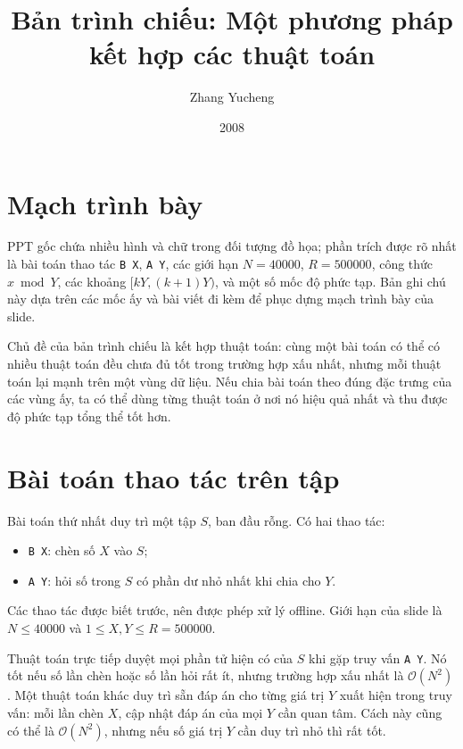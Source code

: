 \documentclass[11pt]{article}
\title{Bản trình chiếu: Một phương pháp kết hợp các thuật toán}
\author{Zhang Yucheng}
\date{2008}
\newcommand{\Oh}{\mathcal{O}}
\begin{document}
\maketitle


\section{Mạch trình bày}

PPT gốc chứa nhiều hình và chữ trong đối tượng đồ họa; phần trích được rõ
nhất là bài toán thao tác \texttt{B X}, \texttt{A Y}, các giới hạn
\(N=40000\), \(R=500000\), công thức \(x\bmod Y\), các khoảng
\([kY,(k+1)Y)\), và một số mốc độ phức tạp. Bản ghi chú này dựa trên các mốc
ấy và bài viết đi kèm để phục dựng mạch trình bày của slide.

Chủ đề của bản trình chiếu là kết hợp thuật toán: cùng một bài toán có thể có
nhiều thuật toán đều chưa đủ tốt trong trường hợp xấu nhất, nhưng mỗi thuật
toán lại mạnh trên một vùng dữ liệu. Nếu chia bài toán theo đúng đặc trưng
của các vùng ấy, ta có thể dùng từng thuật toán ở nơi nó hiệu quả nhất và thu
được độ phức tạp tổng thể tốt hơn.

\section{Bài toán thao tác trên tập}

Bài toán thứ nhất duy trì một tập \(S\), ban đầu rỗng. Có hai thao tác:
\begin{itemize}
  \item \texttt{B X}: chèn số \(X\) vào \(S\);
  \item \texttt{A Y}: hỏi số trong \(S\) có phần dư nhỏ nhất khi chia cho
  \(Y\).
\end{itemize}
Các thao tác được biết trước, nên được phép xử lý offline. Giới hạn của slide
là \(N\le 40000\) và \(1\le X,Y\le R=500000\).

Thuật toán trực tiếp duyệt mọi phần tử hiện có của \(S\) khi gặp truy vấn
\texttt{A Y}. Nó tốt nếu số lần chèn hoặc số lần hỏi rất ít, nhưng trường hợp
xấu nhất là \(\Oh(N^2)\). Một thuật toán khác duy trì sẵn đáp án cho từng giá
trị \(Y\) xuất hiện trong truy vấn: mỗi lần chèn \(X\), cập nhật đáp án của
mọi \(Y\) cần quan tâm. Cách này cũng có thể là \(\Oh(N^2)\), nhưng nếu số
giá trị \(Y\) cần duy trì nhỏ thì rất tốt.
\end{document}
